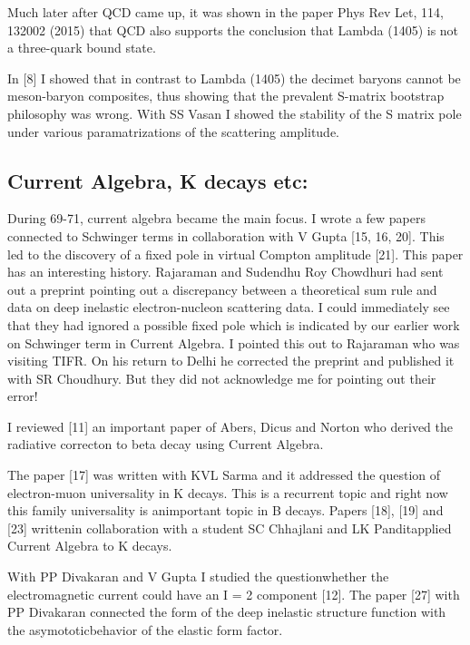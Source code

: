 Much later after QCD came up, it was shown in the paper Phys Rev Let, 
114, 132002 (2015) that QCD also supports the conclusion that Lambda 
(1405) is not a three-quark bound state.

In [8] I showed that in contrast to Lambda (1405) the decimet baryons 
cannot be meson-baryon composites, thus showing that the prevalent 
S-matrix bootstrap philosophy was wrong. With SS Vasan I showed the 
stability of the S matrix pole under various paramatrizations of the 
scattering amplitude.

\vspace{-\topsep}
\subsection*{Current Algebra, K decays etc:}

During 69-71, current algebra became the main focus. I wrote a few 
papers connected to Schwinger terms in collaboration with V Gupta 
[15, 16, 20]. This led to the discovery of a fixed pole in virtual Compton 
amplitude [21]. This paper has an interesting history. Rajaraman and 
Sudendhu Roy Chowdhuri had sent out a preprint pointing out a 
discrepancy between a theoretical sum rule and data on deep inelastic 
electron-nucleon scattering data. I could immediately see that they had 
ignored a possible fixed pole which is indicated by our earlier work on 
Schwinger term in Current Algebra. I pointed this out to Rajaraman who 
was visiting TIFR. On his return to Delhi he corrected the preprint and 
published it with SR Choudhury. But they did not acknowledge me for 
pointing out their error!

I reviewed [11] an important paper of Abers, Dicus and Norton who 
derived the radiative correcton to beta decay using Current Algebra.

The paper [17] was written with KVL Sarma and it addressed the question 
of electron-muon universality in K decays. This is a recurrent topic and 
right now this family universality is an\break important topic in B decays. 
Papers [18], [19] and [23] written\break in collaboration with a student SC 
Chhajlani and LK Pandit\break applied Current Algebra to K decays.

With PP Divakaran and V Gupta I studied the question\break whether the 
electromagnetic current could have an I = 2 compo\-nent [12]. The paper 
[27] with PP Divakaran connected the form of the deep inelastic 
structure function with the asymototic\break behavior of the elastic form 
factor.

